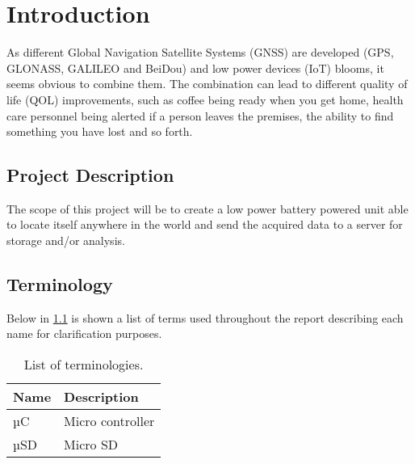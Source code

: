 
\chapter{Introduction}
\label{sec:introduction}
As different Global Navigation Satellite Systems (GNSS) are developed (GPS, GLONASS, GALILEO and BeiDou) and low power devices (IoT) blooms, it seems obvious to combine them.
The combination can lead to different quality of life (QOL) improvements, such as coffee being ready when you get home, health care personnel being alerted if a person leaves the premises, the ability to find something you have lost and so forth.

\section{Project Description}
\label{sec:projectDescription}
The scope of this project will be to create a low power battery powered unit able to locate itself anywhere in the world and send the acquired data to a server for storage and/or analysis.

\section{Terminology}
\label{sec:terminology}
Below in \cref{tab:terminology} is shown a list of terms used throughout the report describing each name for clarification purposes.

\begin{table}[H]
	\centering
	\begin{tabularx}{0.8\textwidth}{l X}
		\toprule
		\textbf{Name} & \textbf{Description} \\
		\midrule
		µC & Micro controller \\
		µSD & Micro SD \\
		\bottomrule
	\end{tabularx}
	\caption{List of terminologies.}
	\label{tab:terminology}
\end{table}